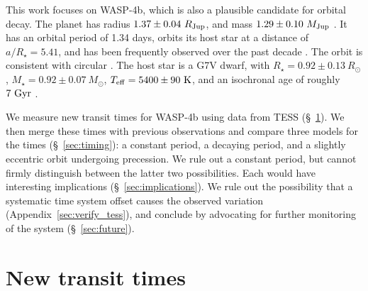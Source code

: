 \documentclass[12pt,twocolumn,tighten]{aastex62}
\begin{document}
This work focuses on WASP-4b, which is also a plausible candidate for
orbital decay.  The planet has radius $1.37 \pm 0.04\ R_{\rm Jup}$, and
mass $1.29 \pm 0.10\ M_{\rm Jup}$ \citep{southworth_homogeneous_2011}.
It has an orbital period of 1.34 days, orbits its host star at a
distance of $a/R_\star = 5.41$, and has been frequently observed over
the past decade \citep{wilson_wasp-4b_2008,huitson_gemini_2017}.  The
orbit is consistent with circular \citep[][but see
\S~\ref{sec:apsidal_precession}]{beerer_secondary_2011,husnoo_observational_2012,bonomo_gaps_2017}.
The host star is a G7V dwarf, with $R_\star = 0.92 \pm 0.13\ R_\odot$,
$M_\star = 0.92 \pm 0.07\ M_\odot$, $T_{\rm eff} = 5400 \pm 90\ {\rm
K}$, and an isochronal age of roughly $7\ {\rm Gyr}$
\citep{southworth_homogeneous_2011,petrucci_no_2013,doyle_accurate_2013}.

We measure new transit times for WASP-4b using data from TESS
(\S~\ref{sec:transits}).  We then merge these times with previous
observations and compare three models for the times
(\S~\ref{sec:timing}): a constant period, a decaying period, and a
slightly eccentric orbit undergoing precession.  We rule out a constant
period, but cannot firmly distinguish between the latter two
possibilities.  Each would have interesting implications
(\S~\ref{sec:implications}).  We rule out the possibility that a
systematic time system offset causes the observed variation
(Appendix~\ref{sec:verify_tess}), and conclude by advocating for further
monitoring of the system (\S~\ref{sec:future}).



\section{New transit times}
\label{sec:transits}
\end{document}
